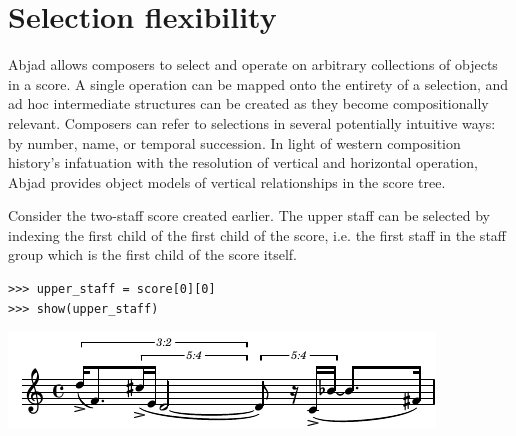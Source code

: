 \documentclass{article}
\begin{document}
\section{Selection flexibility} \label{sec:selection-flexibility}

Abjad allows composers to select and operate on arbitrary collections of
objects in a score. A single operation can be mapped onto the entirety of a
selection, and ad hoc intermediate structures can be created as they become
compositionally relevant. Composers can refer to selections in several
potentially intuitive ways: by number, name, or temporal succession. In light
of western composition history's infatuation with the resolution of vertical
and horizontal operation, Abjad provides object models of vertical
relationships in the score tree.




Consider the two-staff score created earlier. The upper staff can be selected
by indexing the first child of the first child of the score, i.e. the first
staff in the staff group which is the first child of the score itself.

\begin{lstlisting}
>>> upper_staff = score[0][0]
>>> show(upper_staff)
\end{lstlisting}
\includegraphics{assets/lilypond-dcce2b5927dd4f606034c3efcde7da2e.pdf}
\end{document}
